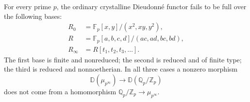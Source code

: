 \begin{proposition}
\label{B:crystal-counterexamples}
For every prime $p$, the ordinary crystalline Dieudonn\'e functor
fails to be full over the following bases:
\begin{align*}
 R_0&=\mathbb F_p[x,y]/(x^2,xy,y^2),\\
 R&=\mathbb F_p[a,b,c,d]/(ac,ad,bc,bd),\\
 R_\infty&=R[t_1,t_2,t_3,\ldots].
\end{align*}
The first base is finite and nonreduced; the second is reduced and
of finite type; the third is reduced and nonnoetherian.
In all three cases a nonzero morphism
\[
 \mathbb D(\mu_{p^\infty})\longrightarrow
 \mathbb D(\mathbb Q_p/\mathbb Z_p)
\]
does not come from a homomorphism
$\mathbb Q_p/\mathbb Z_p\to\mu_{p^\infty}$.
\end{proposition}

